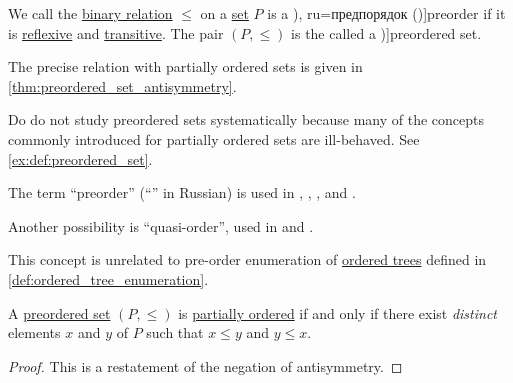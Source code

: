 \begin{definition}\label{def:preordered_set}
  We call the \hyperref[def:binary_relation]{binary relation} \( \leq \) on a \hyperref[def:set]{set} \( P \) is a \term[bg=преднаредба (\cite[9]{Проданов1982ФункционаленАнализЧаст1}), ru=предпорядок (\cite[def. 3.1]{Гуров2013ТеорияРешёток})]{preorder} if it is \hyperref[def:binary_relation/reflexive]{reflexive} and \hyperref[def:binary_relation/transitive]{transitive}. The pair \( (P, \leq) \) is the called a \term[en=preordered set (\cite[119]{Golan1999Semirings})]{preordered set}.
\end{definition}
\begin{comments}
  \item The precise relation with partially ordered sets is given in \cref{thm:preordered_set_antisymmetry}.

  \item Do do not study preordered sets systematically because many of the concepts commonly introduced for partially ordered sets are ill-behaved. See \cref{ex:def:preordered_set}.

  \item The term \enquote{preorder} (\enquote{} in Russian) is used in
  \cite[133]{Bourbaki2004TheoryOfSets},
  \cite[3]{Grätzer2011LatticeTheory},
  \cite[\S 5.4.2]{Mimram2020ProgramEqualsProof},
  \cite[10]{ЦаленкоШульгейфер1974ОсновыТеорииКатегорий}
  \cite[def. 3.1]{Гуров2013ТеорияРешёток}  and
  \cite[66]{БелоусовТкачёв2004ДискретнаяМатематика}.

  Another possibility is \enquote{quasi-order}, used in
  \cite[20]{Birkhoff1967LatticeTheory} and
  \cite[445]{Rotman2015AdvancedModernAlgebraPart1}.

  \item This concept is unrelated to pre-order enumeration of \hyperref[def:ordered_tree]{ordered trees} defined in \cref{def:ordered_tree_enumeration}.
\end{comments}

\begin{proposition}\label{thm:preordered_set_antisymmetry}
  A \hyperref[def:preordered_set]{preordered set} \( (P, \leq) \) is \hyperref[def:partially_ordered_set]{partially ordered} if and only if there exist \emph{distinct} elements \( x \) and \( y \) of \( P \) such that \( x \leq y \) and \( y \leq x \).
\end{proposition}
\begin{proof}
  This is a restatement of the negation of antisymmetry.
\end{proof}

